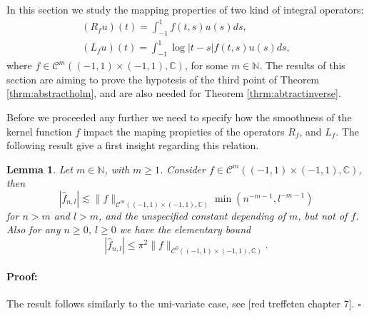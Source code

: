 \documentclass{article}
\newtheorem{lemma}[theorem]{Lemma}
\newenvironment{proof}{\paragraph{Proof:}}{\hfill$\square$}
\newcommand{\todo}[1]{{\color{red}[#1]}}
\newcommand{\IC}{{\mathbb C}}
\newcommand{\IN}{{\mathbb N}}
\newcommand{\cmspace}[3]{\mathcal{C}^{#1} \left( #2, #3 \right)}
\newcommand{\iinterv}{(-1,1)\times(-1,1)}
\begin{document}
In this section we study the mapping properties of two kind of integral operators: 
\begin{align*}
(R_f u)(t) = \int_{-1}^1f(t,s) u(s) ds,\\
(L_fu)(t) = \int_{-1}^1 \log|t-s| f(t,s) u(s) ds,
\end{align*}
where $f \in \cmspace{m}{(-1,1)\times(-1,1)}{\IC}$, for some $m \in \IN$. The results of this section are aiming to prove the hypotesis of the third point of Theorem \ref{thrm:abstractholm}, and are also needed for Theorem \ref{thrm:abtractinverse}.

Before we proceeded any further we need to specify how the smoothness of the kernel function $f$ impact the maping propieties of the operators $R_f$, and $L_f$. The following result give a first insight regarding this relation. 

\begin{lemma}
\label{lemma:cmdecay}
Let $m \in \IN$, with $m\geq 1$. Consider $f \in \cmspace{m}{\iinterv}{\IC}$, then 
$$|\widehat{f}_{n,l}| \lesssim \|f\|_{\cmspace{m}{\iinterv}{\IC}}  \min ( n^{-m-1}, l^{-m-1})$$
for $n>m$ and $l>m$, and the unspecified constant depending of $m$, but not of $f$. Also for any $n \geq 0$, $l \geq 0$ we have the elementary bound 
$$ |\widehat{f}_{n,l}| \leq \pi^2 \|f\|_{\cmspace{0}{\iinterv}{\IC}}  .$$
\end{lemma}
\begin{proof}
The result follows similarly to the uni-variate case, see \todo{red treffeten chapter 7}. 
\end{proof}
\end{document}
